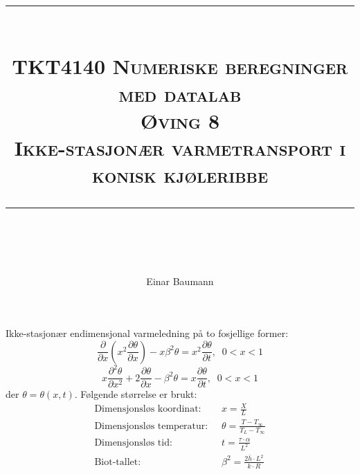 




\author{Einar Baumann}
\title{
    \vspace{-1in}
    \vspace{0.1in}
    \rule{\textwidth}{0.5pt} \\[0.5cm]
    \normalfont \normalsize \textsc{TKT4140 Numeriske beregninger med datalab} \\ [20pt]
    {\textsc{ \huge Øving 8 }} \\ [0.5cm]
    {\textsc {\Large Ikke-stasjonær varmetransport i konisk kjøleribbe} } \\
    \vspace{0.1in}
    \rule{\textwidth}{2pt} \\[0.7cm]
}


\maketitle
\thispagestyle{empty}
\clearpage

\noindent Ikke-stasjonær endimensjonal varmeledning på to fosjellige former:
\begin{equation}
    \frac{\partial}{\partial x} \left( x^2 \frac{\partial \theta}{\partial x} \right)
  - x \beta^2 \theta = x^2 \frac{\partial \theta}{\partial t}, \;\; 0< x < 1
\end{equation}
\begin{equation}
    x \frac{\partial^2 \theta}{\partial x^2}
  + 2 \frac{\partial \theta}{\partial x}
  - \beta^2 \theta
  = x \frac{\partial \theta}{\partial t}, \;\; 0<x<1
\end{equation}
der $\theta = \theta(x,t)$. Følgende størrelse er brukt:
\begin{subequations}
\begin{align}
  \text{Dimensjonsløs koordinat: }\;  & x = \frac{X}{L} \\
  \text{Dimensjonsløs temperatur: }\; & \theta = \frac{T-T_\infty}{T_L - T_\infty} \\
  \text{Dimensjonsløs tid: }\;        & t = \frac{\tau \cdot \alpha}{L^2} \\
  \text{Biot-tallet: }\;              & \beta^2 = \frac{2\bar h \cdot L^2}{k \cdot R}
\end{align}
\end{subequations}



